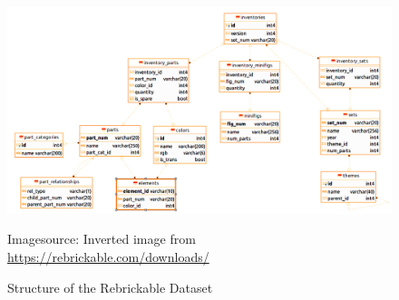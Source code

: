 \documentclass{article}
\theoremstyle{plain}
\theoremstyle{definition}
\theoremstyle{remark}
\newcommand*{\quelle}{
  \footnotesize Imagesource: Inverted image from\\
}
\begin{document}
\begin{figure}[ht]
 \vskip 0.2in
 \begin{center}
 \centerline{\includegraphics[width=\columnwidth]{../Images/inverted_database.png}}
 \quelle\url{https://rebrickable.com/downloads/}
\caption{Structure of the Rebrickable Dataset}
\label{icml-historical}
 \end{center}
 \vskip 0.1in
\end{figure}
\end{document}
